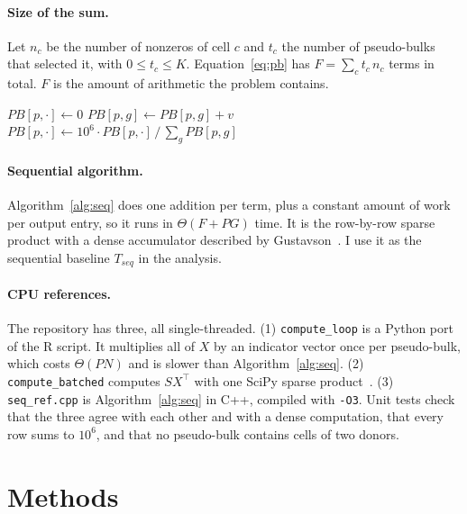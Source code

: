 \documentclass[sigconf,nonacm]{acmart}
\newcommand{\code}[1]{\texttt{#1}}
\newcommand{\file}[1]{{\urlstyle{tt}\nolinkurl{#1}}}   %
\begin{document}
\paragraph{Size of the sum.} Let $n_c$ be the number of nonzeros of cell $c$ and $t_c$ the number of
pseudo-bulks that selected it, with $0 \le t_c \le K$. Equation~\ref{eq:pb} has
$F = \sum_c t_c\,n_c$ terms in total. $F$ is the amount of arithmetic the problem contains.

\begin{algorithm}[t]
\caption{Sequential pseudo-bulk generation. $X$ is stored by cell (CSC), $S$ by pseudo-bulk (CSR).}
\label{alg:seq}
\begin{algorithmic}[1]
  \State $PB[p, \cdot] \gets 0$
      \State $PB[p,g] \gets PB[p,g] + v$
    \EndFor
  \EndFor
  \State $PB[p, \cdot] \gets 10^6 \cdot PB[p, \cdot] \,/\, \sum_g PB[p,g]$
\EndFor
\end{algorithmic}
\end{algorithm}

\paragraph{Sequential algorithm.} Algorithm~\ref{alg:seq} does one addition per term, plus a
constant amount of work per output entry, so it runs in $\Theta(F + PG)$ time. It is the row-by-row
sparse product with a dense accumulator described by Gustavson~\cite{gustavson1978}. I use it as the
sequential baseline $T_{seq}$ in the analysis.

\paragraph{CPU references.} The repository has three, all single-threaded. (1) \code{compute\_loop}
is a Python port of the R script. It multiplies all of $X$ by an indicator vector once per
pseudo-bulk, which costs $\Theta(PN)$ and is slower than Algorithm~\ref{alg:seq}. (2)
\code{compute\_batched} computes $S X^{\top}$ with one SciPy sparse product~\cite{scipy2020}. (3)
\file{seq_ref.cpp} is Algorithm~\ref{alg:seq} in C++, compiled with \code{-O3}. Unit tests check
that the three agree with each other and with a dense computation, that every row sums to $10^6$,
and that no pseudo-bulk contains cells of two donors.

\section{Methods}
\end{document}
